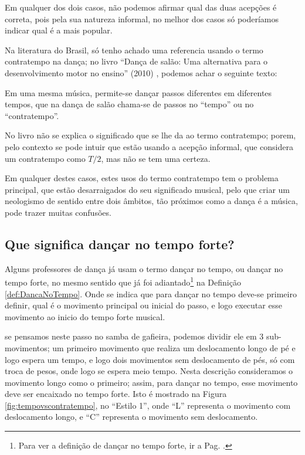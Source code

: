 Em qualquer dos dois casos, não podemos afirmar qual das duas acepções é correta,
pois pela sua natureza informal,
no melhor dos casos só poderíamos indicar qual é a mais popular.

Na literatura do Brasil, só tenho achado uma referencia usando o termo contratempo na dança;
no livro ``Dança de salão: Uma alternativa para o desenvolvimento motor no ensino'' 
(2010) \cite{maia2010danca}, podemos achar o seguinte texto:
\begin{citando}
Em uma mesma música, permite-se dançar passos diferentes em diferentes tempos,
que na dança de salão chama-se de passos no ``tempo'' ou no ``contratempo''.
\end{citando}
No livro não se explica o significado que se lhe da ao termo contratempo;
porem, pelo contexto se pode intuir que estão usando a acepção informal, 
que considera um contratempo como $T/2$, mas não se tem uma certeza.

Em qualquer destes casos, 
estes usos do termo contratempo tem o problema principal, 
que estão desarraigados do seu significado musical,
pelo que criar um neologismo de sentido entre dois âmbitos, 
tão próximos como a dança é a música, pode trazer muitas confusões.


\subsection{Que significa dançar no tempo forte? }
Alguns professores de dança já usam o termo dançar no tempo, 
ou dançar no tempo forte, no mesmo sentido que já foi adiantado\footnote{Para 
ver a definição de dançar no tempo forte, ir a Pag. \pageref{def:DancaNoTempo}.}
 na Definição \ref{def:DancaNoTempo}.
Onde se indica que para dançar no tempo deve-se primeiro definir,
 qual é o movimento principal ou inicial do passo,
e logo executar esse movimento ao inicio do tempo forte musical.
\begin{example}
\label{ex:frentetrasex}
se pensamos neste passo no samba de gafieira,
podemos dividir ele em 3 sub-movimentos; 
um primeiro movimento que realiza um deslocamento longo de pé e logo espera um tempo,
e logo dois movimentos sem deslocamento de pés, só com troca de pesos,
 onde logo se espera meio tempo.  
Nesta descrição consideramos o movimento longo como o primeiro;
assim, para dançar no tempo, esse movimento deve ser encaixado no tempo forte.
Isto é mostrado na Figura \ref{fig:tempovscontratempo}, no ``Estilo 1'',
onde ``L'' representa o movimento com deslocamento longo,
e ``C'' representa o movimento sem deslocamento.
\end{example}


